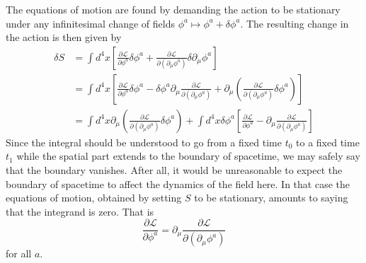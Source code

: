 \documentclass[twoside,utf8]{article}
\begin{document}
The equations of motion are found by demanding the action to be stationary under any infinitesimal change of fields $\phi^a \mapsto \phi^a + \delta \phi^a$. The resulting change in the action is then given by
\begin{equation*}
	\begin{align}
	\delta S
	&= \int d^4 x \left[\frac{\partial \mathcal{L}}{\partial \phi^a}\delta \phi^a + \frac{\partial \mathcal{L}}{\partial (\partial_\mu\phi^a)}\delta \partial_\mu \phi^a\right] \\
	&= \int d^4 x \left[\frac{\partial \mathcal{L}}{\partial \phi^a}\delta \phi^a
	- \delta \phi^a \partial_\mu \frac{\partial \mathcal{L}}{\partial (\partial_\mu\phi^a)}
	+ \partial_\mu\left(\frac{\partial \mathcal{L}}{\partial (\partial_\mu\phi^a)}\delta \phi^a \right) \right] \\
	&=
	\int d^4 x \partial_\mu\left(\frac{\partial \mathcal{L}}{\partial (\partial_\mu\phi^a)}\delta \phi^a \right)
	+
	\int d^4 x \delta \phi^a\left[\frac{\partial \mathcal{L}}{\partial \phi^a}
	-  \partial_\mu\frac{\partial \mathcal{L}}{\partial(\partial_\mu\phi^a)}
	\right]
	\end{align}
\end{equation*}
Since the integral should be understood to go from a fixed time $t_0$ to a fixed time $t_1$ while the spatial part extends to the boundary of spacetime, we may safely say that the boundary vanishes. After all, it would be unreasonable to expect the boundary of spacetime to affect the dynamics of the field here. In that case the equations of motion, obtained by setting $S$ to be stationary, amounts to saying that the integrand is zero. That is
\[
\frac{\partial \mathcal{L}}{\partial \phi^a}
= \partial_\mu\frac{\partial \mathcal{L}}{\partial(\partial_\mu\phi^a)}
\]
for all $a$.
\end{document}
